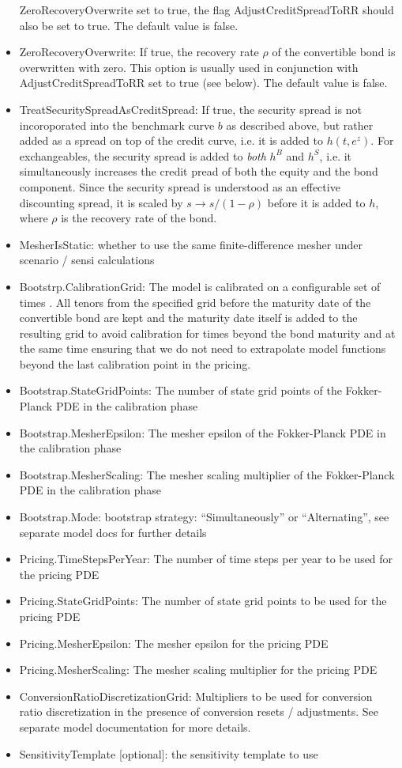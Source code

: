 \begin{itemize}
  ZeroRecoveryOverwrite set to true, the flag AdjustCreditSpreadToRR should also be set to true. The default value is
  false.
\item ZeroRecoveryOverwrite: If true, the recovery rate $\rho$ of the convertible bond is overwritten with zero. This
  option is usually used in conjunction with AdjustCreditSpreadToRR set to true (see below). The default value is false.
\item TreatSecuritySpreadAsCreditSpread: If true, the security spread is not incoroporated into the benchmark curve $b$
  as described above, but rather added as a spread on top of the credit curve, i.e. it is added to $h(t,e^z)$. For
  exchangeables, the security spread is added to {\em both} $h^B$ and $h^S$, i.e. it simultaneously increases the credit
  pread of both the equity and the bond component. Since the security spread is understood as an effective discounting
  spread, it is scaled by $s \rightarrow s / (1-\rho)$ before it is added to $h$, where $\rho$ is the recovery rate of
  the bond.
\item MesherIsStatic: whether to use the same finite-difference mesher under scenario / sensi calculations
\item Bootstrp.CalibrationGrid: The model is calibrated on a configurable set of times . All tenors from the specified
  grid before the maturity date of the convertible bond are kept and the maturity date itself is added to the resulting
  grid to avoid calibration for times beyond the bond maturity and at the same time ensuring that we do not need to
  extrapolate model functions beyond the last calibration point in the pricing.
\item Bootstrap.StateGridPoints: The number of state grid points of the Fokker-Planck PDE in the calibration phase
\item Bootstrap.MesherEpsilon: The mesher epsilon of the Fokker-Planck PDE in the calibration phase
\item Bootstrap.MesherScaling: The mesher scaling multiplier of the Fokker-Planck PDE in the calibration phase
\item Bootstrap.Mode: bootstrap strategy: ``Simultaneously'' or  ``Alternating'', see separate model docs for further details 
\item Pricing.TimeStepsPerYear: The number of time steps per year to be used for the pricing PDE
\item Pricing.StateGridPoints: The number of state grid points to be used for the pricing PDE
\item Pricing.MesherEpsilon: The mesher epsilon for the pricing PDE
\item Pricing.MesherScaling: The mesher scaling multiplier for the pricing PDE
\item ConversionRatioDiscretizationGrid: Multipliers to be used for conversion ratio discretization in the presence of
  conversion resets / adjustments. See separate model documentation for more details.
\item SensitivityTemplate [optional]: the sensitivity template to use
\end{itemize}

